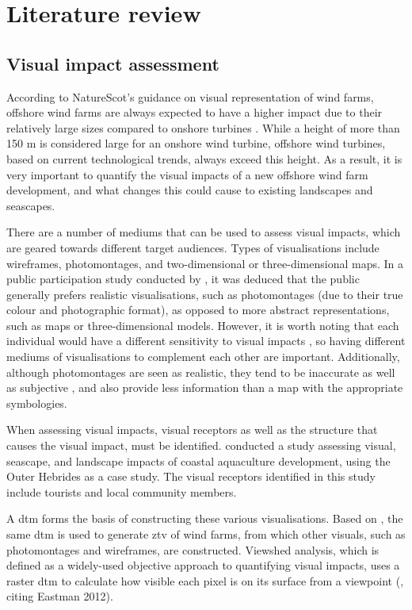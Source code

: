 \chapter{Literature review}

\section{Visual impact assessment}

According to NatureScot's guidance on visual representation of wind farms,
offshore wind farms are always expected to have a higher impact due to their
relatively large sizes compared to onshore turbines
\autocite{naturescot-visual}. While a height of more than 150 m is considered
large for an onshore wind turbine, offshore wind turbines, based on current
technological trends, always exceed this height. As a result, it is very
important to quantify the visual impacts of a new offshore wind farm
development, and what changes this could cause to existing landscapes and
seascapes.

There are a number of mediums that can be used to assess visual impacts, which
are geared towards different target audiences. Types of visualisations include
wireframes, photomontages, and two-dimensional or three-dimensional maps. In a
public participation study conducted by \cite{berry2011}, it was deduced that
the public generally prefers realistic visualisations, such as photomontages
(due to their true colour and photographic format), as opposed to more abstract
representations, such as maps or three-dimensional models. However, it is worth
noting that each individual would have a different sensitivity to visual
impacts \autocite{falconer2013,appleton2003}, so having different mediums of
visualisations to complement each other are important. Additionally, although
photomontages are seen as realistic, they tend to be inaccurate as well as
subjective \autocite{falconer2013}, and also provide less information than a
map with the appropriate symbologies.

When assessing visual impacts, visual receptors as well as the structure that
causes the visual impact, must be identified. \cite{falconer2013} conducted a
study assessing visual, seascape, and landscape impacts of coastal aquaculture
development, using the Outer Hebrides as a case study. The visual receptors
identified in this study include tourists and local community members.

A \gls{dtm} forms the basis of constructing these various visualisations. Based
on \cite{naturescot-visual}, the same \gls{dtm} is used to generate \gls{ztv}
of wind farms, from which other visuals, such as photomontages and wireframes,
are constructed. Viewshed analysis, which is defined as a widely-used objective
approach to quantifying visual impacts, uses a raster \gls{dtm} to calculate
how visible each pixel is on its surface from a viewpoint (\cite{falconer2013},
citing Eastman 2012).

